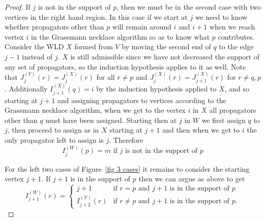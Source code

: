 \documentclass[11pt]{article}
\theoremstyle{remark}
\theoremstyle{definition}
\begin{document}
\begin{proof}
       If $j$ is not in the support of $p$, then we must be in the second case with two vertices in the right hand region.  In this case if we start at $j$ we need to know whether propagators other than $p$ will remain around $i$ and $i+1$ when we reach vertex $i$ in the Grassmann necklace algorithm so as to know what $p$ contributes.  Consider the WLD $X$ formed from $V$ by moving the second end of $q$ to the edge $j-1$ instead of $j$.  $X$ is still admissible since we have not decreased the support of any set of propagators, so the induction hypothesis applies to it as well.  Note that $J_{j}^{(V)}(r) = J_{j}^{(X)}(r)$ for all $r\neq p$ and $J_{j}^{(X)}(r) = J_{j+1}^{(X)}(r)$ for $r\neq q,p$.  Additionally $I_{j+1}^{(X)}(q) = i$ by the induction hypothesis applied to $X$, and so starting at $j+1$ and assigning propagators to vertices according to the Grassmann necklace algorithm, when we get to the vertex $i$ in $X$ all propagators other than $q$ must have been assigned.  Starting then at $j$ in $W$ we first assign $q$ to $j$, then proceed to assign as in $X$ starting at $j+1$ and then when we get to $i$ the only propagator left to assign is $j$.  Therefore
       \[
       I_j^{(W)}(p) = m \text{ if $j$ is not in the support of $p$}
       \]
       
For the left two cases of Figure~\ref{fig 3 cases} it remains to consider the starting vertex $j+1$. If $j+1$ is in the support of $p$ then we can argue as above to get
\[
       I_{j+1}^{(W)}(r)  = \begin{cases}
         j+1 & \text{if $r=p$ and $j+1$ is in the support of $p$}\\
         I_{j+2}^{(V)}(r) & \text{if $r\neq p$ and $j+1$ is in the support of $p$}.
       \end{cases}
       \]


\end{proof}
\end{document}

